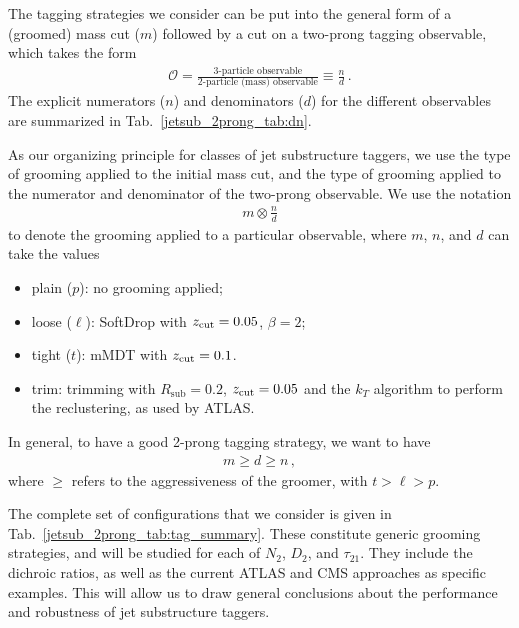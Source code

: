 \documentclass[11pt]{cernrep}
\begin{document}
The tagging strategies we consider can be put into the general form of a (groomed) mass cut ($m$) followed by a cut on a two-prong tagging observable, which takes the form
%
\begin{align}
\mathcal{O}=\frac{\text{3-particle observable}}{\text{2-particle (mass) observable}} \equiv \frac{n}{d}\,.
\end{align}
%
The explicit numerators ($n$) and denominators ($d$) for the different observables are summarized in Tab.~\ref{jetsub_2prong_tab:dn}.

As our organizing principle for classes of  jet substructure taggers, we use the type of grooming applied to the initial mass cut, and the type of grooming applied to the numerator and denominator of the two-prong observable.
%
We use the notation 
\begin{align}
m \otimes \frac{n}{d}
\end{align}
%
to denote the grooming applied to a particular observable, where $m$, $n$, and $d$ can take the values
%
\begin{itemize}
\item plain ($p$): no grooming applied;
\item loose ($\ell$): SoftDrop with ${z_{\rm cut}}=0.05$, $\beta=2$;
\item tight ($t$): mMDT with ${z_{\rm cut}}=0.1$.
\item trim: trimming with $R_{\text{sub}}=0.2$,  $ {z_{\rm cut}}=0.05$ and the $k_T$ algorithm to perform the reclustering, as used by ATLAS.
\end{itemize}
%
In general, to have a good 2-prong tagging strategy, we want to have
\begin{align}
m \geq d \geq n\,,
\end{align}
%
where $\geq$ refers to the aggressiveness of the groomer, with $t > \ell > p$.

The complete set of configurations that we consider is given in Tab.~\ref{jetsub_2prong_tab:tag_summary}.
%
These constitute generic grooming strategies, and will be studied for each of $N_2$, $D_2$, and $\tau_{21}$.
%
They include the dichroic ratios, as well as the current ATLAS and CMS approaches as specific examples.
%
This will allow us to draw general conclusions about the performance and robustness of jet substructure taggers.
\end{document}
